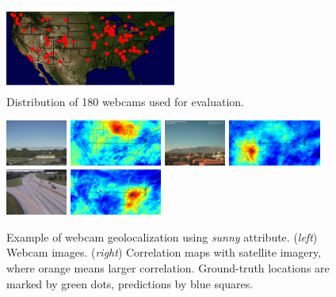 \documentclass[10pt,twocolumn,letterpaper]{article}
\begin{document}
\begin{figure}[t]
	\centering
		\includegraphics[width=0.5\textwidth, trim= 0mm 5mm 0mm 0mm]{figs/geoloc/webcam_dist}
		\caption{Distribution of 180 webcams used for evaluation.}
		\label{fig:webcamdist}
\end{figure}

\begin{figure}
	\centering
		\includegraphics[width=0.18\textwidth]{figs/geoloc/297}
		\includegraphics[width=0.27\textwidth]{figs/geoloc/geoloc_8_297}
		\includegraphics[width=0.18\textwidth]{figs/geoloc/5207}
		\includegraphics[width=0.27\textwidth]{figs/geoloc/geoloc_24_5207}
		\includegraphics[width=0.18\textwidth]{figs/geoloc/23573}
		\includegraphics[width=0.27\textwidth]{figs/geoloc/geoloc_152_23573}
		\caption{Example of webcam geolocalization using
          \textit{sunny} attribute. (\emph{left}) Webcam images. (\emph{right})
          Correlation maps with satellite imagery, where orange 
          means larger correlation. Ground-truth locations are marked
          by green dots, predictions by blue squares.}
		\label{fig:geoloc}
\end{figure}
\end{document}
